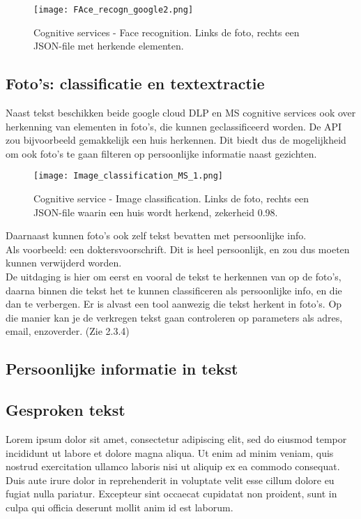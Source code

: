 \begin{figure}[h]
	\texttt{[image: FAce\_recogn\_google2.png]}
	\caption{Cognitive services - Face recognition. Links de foto, rechts een JSON-file met herkende elementen.}
	\label{fig:facerecogn}
\end{figure}


\subsection{Foto's: classificatie en textextractie}
Naast tekst beschikken beide google cloud DLP en MS cognitive services ook over herkenning van elementen in foto's, die kunnen geclassificeerd worden. De API zou bijvoorbeeld gemakkelijk een huis herkennen. Dit biedt dus de mogelijkheid om ook foto's te gaan filteren op persoonlijke informatie naast gezichten. 


\begin{figure}[h]
	\texttt{[image: Image\_classification\_MS\_1.png]}
	\caption{Cognitive service - Image classification. Links de foto, rechts een JSON-file waarin een huis wordt herkend, zekerheid 0.98. }
	\label{fig:Houserecogn}
\end{figure}

Daarnaast kunnen foto's ook zelf tekst bevatten met persoonlijke info. 
\\ Als voorbeeld: een doktersvoorschrift. Dit is heel persoonlijk, en zou dus moeten kunnen verwijderd worden.
\\ De uitdaging is hier om eerst en vooral de tekst te herkennen van op de foto's, daarna binnen die tekst het te kunnen classificeren als persoonlijke info, en die dan te verbergen.
Er is alvast een tool aanwezig die tekst herkent in foto's. Op die manier kan je de verkregen tekst gaan controleren op parameters als adres, email, enzoverder. (Zie 2.3.4)

\subsection{Persoonlijke informatie in tekst}


\subsection{Gesproken tekst}
Lorem ipsum dolor sit amet, consectetur adipiscing elit, sed do eiusmod tempor incididunt ut labore et dolore magna aliqua. Ut enim ad minim veniam, quis nostrud exercitation ullamco laboris nisi ut aliquip ex ea commodo consequat. Duis aute irure dolor in reprehenderit in voluptate velit esse cillum dolore eu fugiat nulla pariatur. Excepteur sint occaecat cupidatat non proident, sunt in culpa qui officia deserunt mollit anim id est laborum.

